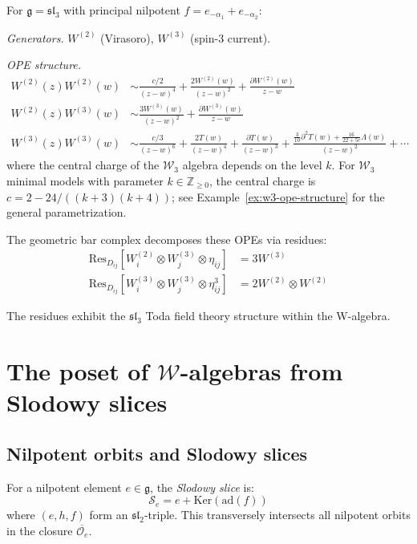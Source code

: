 \begin{example}\label{ex:w-sl3}
For $\mathfrak{g} = \mathfrak{sl}_3$ with principal nilpotent $f = e_{-\alpha_1} + e_{-\alpha_2}$:

\noindent\emph{Generators.} $W^{(2)}$ (Virasoro), $W^{(3)}$ (spin-3 current).

\noindent\emph{OPE structure.}
\begin{align}
W^{(2)}(z)W^{(2)}(w) &\sim \frac{c/2}{(z-w)^4} + \frac{2W^{(2)}(w)}{(z-w)^2} + \frac{\partial W^{(2)}(w)}{z-w} \\
W^{(2)}(z)W^{(3)}(w) &\sim \frac{3W^{(3)}(w)}{(z-w)^2} + \frac{\partial W^{(3)}(w)}{z-w} \\
W^{(3)}(z)W^{(3)}(w) &\sim \frac{c/3}{(z-w)^6} + \frac{2T(w)}{(z-w)^4} + \frac{\partial T(w)}{(z-w)^3} + \frac{\frac{3}{10}\partial^2 T(w) + \frac{16}{22+5c}\Lambda(w)}{(z-w)^2} + \cdots
\end{align}
where the central charge of the $\mathcal{W}_3$ algebra depends on the level $k$. For $\mathcal{W}_3$ minimal models with parameter $k \in \mathbb{Z}_{\geq 0}$, the central charge is $c = 2 - 24/((k+3)(k+4))$; see Example~\ref{ex:w3-ope-structure} for the general parametrization.

The geometric bar complex decomposes these OPEs via residues:
\begin{align}
\text{Res}_{D_{ij}}[W^{(2)}_i \otimes W^{(3)}_j \otimes \eta_{ij}] &= 3W^{(3)} \\
\text{Res}_{D_{ij}}[W^{(3)}_i \otimes W^{(3)}_j \otimes \eta_{ij}^3] &= 2W^{(2)} \otimes W^{(2)}
\end{align}

The residues exhibit the $\mathfrak{sl}_3$ Toda field theory structure within the W-algebra.
\end{example}

 
\section{The poset of $\mathcal{W}$-algebras from Slodowy slices}
 
\subsection{Nilpotent orbits and Slodowy slices}
 
\begin{definition}\label{def:slodowy}
For a nilpotent element $e \in \mathfrak{g}$, the \emph{Slodowy slice} is:
\[
\mathcal{S}_e = e + \text{Ker}(\text{ad}(f))
\]
where $(e,h,f)$ form an $\mathfrak{sl}_2$-triple.
This transversely intersects all nilpotent orbits in the closure $\overline{\mathcal{O}_e}$.
\end{definition}
 
